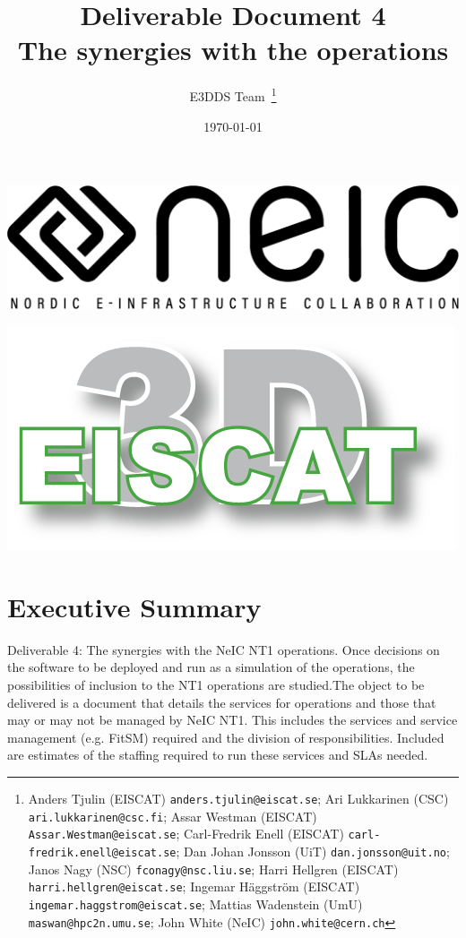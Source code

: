 \documentclass[12pt,a4paper]{article}
\title{
{\bf Deliverable Document 4} \\
The synergies with the \nnt operations}
\author{E3DDS Team~\footnote{
Anders Tjulin (EISCAT) {\tt anders.tjulin@eiscat.se};
Ari Lukkarinen (CSC) {\tt ari.lukkarinen@csc.fi};
Assar Westman (EISCAT) {\tt Assar.Westman@eiscat.se};
Carl-Fredrik Enell (EISCAT) {\tt carl-fredrik.enell@eiscat.se};
Dan Johan Jonsson (UiT) {\tt dan.jonsson@uit.no};
Janos Nagy (NSC) {\tt fconagy@nsc.liu.se};
Harri Hellgren (EISCAT) {\tt harri.hellgren@eiscat.se};
Ingemar H\"{a}ggstr\"{o}m (EISCAT) {\tt ingemar.haggstrom@eiscat.se};
Mattias Wadenstein (UmU) {\tt maswan@hpc2n.umu.se};
John White (NeIC) {\tt john.white@cern.ch}}}https://www.overleaf.com/project/5df3a17505b1d60001bfd09b
\date{\today}
\newcommand{\nnt}{NeIC NT1\xspace}
\begin{document}
\pagestyle{fancy}

\maketitle
\par\noindent
\begin{minipage}{0.5\textwidth}
  \includegraphics[scale=0.18]{NEIC_logo_screen_black.pdf}
\end{minipage}
\begin{minipage}{0.5\textwidth}
  \hfill
  \includegraphics[width=0.75\linewidth]{e3d-logo-green-500px}
\end{minipage}

\newpage
\tableofcontents
\newpage

\section{Executive Summary}
\label{exec-summ}


Deliverable 4: The synergies with the \nnt operations. Once decisions on the software to be deployed and run as a simulation of the \ED operations, the possibilities of inclusion to the NT1 operations are studied.The object to be delivered is a document that details the services for \ED operations and those that may or may not be managed by \nnt. This includes the services and service management (e.g. FitSM) required and the division of responsibilities.  Included are estimates of the staffing required to run these services and SLAs needed. 
\end{document}
